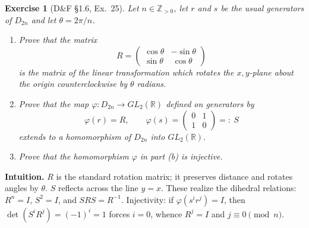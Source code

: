 \documentclass[12pt]{article}
\newtheorem{exercise}[theorem]{Exercise}
\theoremstyle{definition}
\begin{document}
\newpage

\begin{exercise}[D\&F §1.6, Ex.~25]
Let $n\in\mathbb{Z}_{>0}$, let $r$ and $s$ be the usual generators of $D_{2n}$ and let $\theta=2\pi/n$.
\begin{enumerate}
\item[(a)] Prove that the matrix
\[
R=
\begin{pmatrix}
\cos\theta & -\sin\theta\\
\sin\theta & \ \cos\theta
\end{pmatrix}
\]
is the matrix of the linear transformation which rotates the $x,y$-plane about the origin counterclockwise by $\theta$ radians.
\item[(b)] Prove that the map $\varphi:D_{2n}\to GL_2(\mathbb{R})$ defined on generators by
\[
\varphi(r)=R,\qquad 
\varphi(s)=
\begin{pmatrix}
0&1\\
1&0
\end{pmatrix}=:\ S
\]
extends to a homomorphism of $D_{2n}$ into $GL_2(\mathbb{R})$.
\item[(c)] Prove that the homomorphism $\varphi$ in part (b) is injective.
\end{enumerate}
\end{exercise}

\dotfill

\noindent\textbf{Intuition.}
$R$ is the standard rotation matrix; it preserves distance and rotates angles by $\theta$.  
$S$ reflects across the line $y=x$. These realize the dihedral relations: $R^n=I$, $S^2=I$, and $SRS=R^{-1}$.  
Injectivity: if $\varphi(s^i r^j)=I$, then $\det(S^iR^j)=(-1)^i=1$ forces $i=0$, whence $R^j=I$ and $j\equiv0\pmod n$.\\

\dotfill
\end{document}
